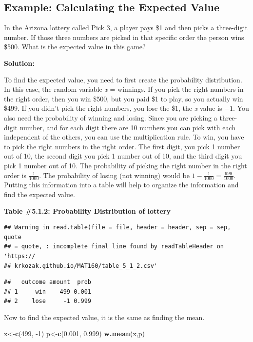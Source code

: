 \documentclass[]{book}
\newenvironment{Shaded}{\begin{snugshade}}{\end{snugshade}}
\newcommand{\DecValTok}[1]{\textcolor[rgb]{0.00,0.00,0.81}{#1}}
\newcommand{\FloatTok}[1]{\textcolor[rgb]{0.00,0.00,0.81}{#1}}
\newcommand{\KeywordTok}[1]{\textcolor[rgb]{0.13,0.29,0.53}{\textbf{#1}}}
\newcommand{\NormalTok}[1]{#1}
\begin{document}
\hypertarget{example-calculating-the-expected-value}{%
\subsection{Example: Calculating the Expected Value}\label{example-calculating-the-expected-value}}

In the Arizona lottery called Pick 3, a player pays \$1 and then picks
a three-digit number. If those three numbers are picked in that
specific order the person wins \$500. What is the expected value in
this game?

\textbf{Solution:}

To find the expected value, you need to first create the probability distribution. In this case, the random variable \emph{x} = winnings. If you pick the right numbers in the right order, then you win \$500, but you paid \$1 to play, so you actually win \$499. If you didn't pick the right numbers, you lose the \$1, the \emph{x} value is \(-1\). You also need the probability of winning and losing. Since you are picking a three-digit number, and for each digit there are 10 numbers you can pick with each independent of the others, you can use the multiplication rule. To win, you have to pick the right numbers in the right order. The first digit, you pick 1 number out of 10, the second digit you pick 1 number out of 10, and the third digit you pick 1 number out of 10. The probability of picking the right number in the right order is \(\frac{1}{1000}\). The probability of losing (not winning) would be \(1-\frac{1}{1000}=\frac{999}{1000}\). Putting this information into a table will help to organize the information and find the expected value.

\textbf{Table \#5.1.2: Probability Distribution of lottery}

\begin{verbatim}
## Warning in read.table(file = file, header = header, sep = sep, quote
## = quote, : incomplete final line found by readTableHeader on 'https://
## krkozak.github.io/MAT160/table_5_1_2.csv'
\end{verbatim}

\begin{verbatim}
##   outcome amount  prob
## 1     win    499 0.001
## 2    lose     -1 0.999
\end{verbatim}

Now to find the expected value, it is the same as finding the mean.

\begin{Shaded}
\begin{Highlighting}[]
\NormalTok{x<-}\KeywordTok{c}\NormalTok{(}\DecValTok{499}\NormalTok{, }\DecValTok{-1}\NormalTok{)}
\NormalTok{p<-}\KeywordTok{c}\NormalTok{(}\FloatTok{0.001}\NormalTok{, }\FloatTok{0.999}\NormalTok{)}
\KeywordTok{w.mean}\NormalTok{(x,p)}
\end{Highlighting}
\end{Shaded}
\end{document}

